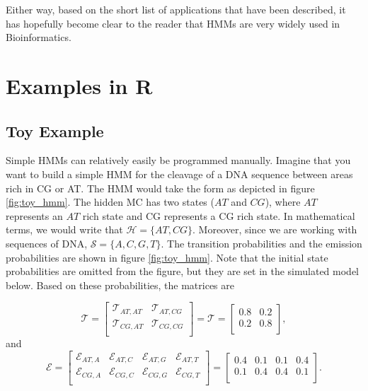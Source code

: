 \documentclass{article}\usepackage[]{graphicx}\usepackage[]{color}
\begin{document}
Either way, based on the short list of applications that have been described, it has hopefully become clear to the reader that HMMs are very widely used in Bioinformatics. 

\section{Examples in R}

\subsection{Toy Example}

Simple HMMs can relatively easily be programmed manually. Imagine that you want to build a simple HMM for the cleavage of a DNA sequence between areas rich in CG or AT. The HMM would take the form as depicted in figure \ref{fig:toy_hmm}. The hidden MC has two states ($AT$ and $CG$), where $AT$ represents an $AT$ rich state and CG represents a CG rich state. In mathematical terms, we would write that $\mathcal{H} = \{AT, CG\}$. Moreover, since we are working with sequences of DNA, $\mathcal{S} = \{A,C,G,T\}$. The transition probabilities and the emission probabilities are shown in figure \ref{fig:toy_hmm}. Note that the initial state probabilities are omitted from the figure, but they are set in the simulated model below. Based on these probabilities, the matrices are

\begin{equation*}
  \mathcal{T} = \begin{bmatrix}
      \mathcal{T}_{AT, AT} & \mathcal{T}_{AT, CG} \\
      \mathcal{T}_{CG, AT} & \mathcal{T}_{CG, CG}  \\
  \end{bmatrix} = \mathcal{T} = \begin{bmatrix}
      0.8 & 0.2 \\
      0.2 & 0.8  \\
  \end{bmatrix},
\end{equation*}
and 
\begin{equation*}
  \mathcal{E} = \begin{bmatrix}
      \mathcal{E}_{AT, A} & \mathcal{E}_{AT, C} & \mathcal{E}_{AT, G} & \mathcal{E}_{AT, T}\\
      \mathcal{E}_{CG, A} & \mathcal{E}_{CG, C} & \mathcal{E}_{CG, G} & \mathcal{E}_{CG, T}\\
  \end{bmatrix} = \begin{bmatrix}
     0.4 & 0.1 & 0.1 & 0.4 \\
      0.1 & 0.4 & 0.4 & 0.1 \\
  \end{bmatrix}.
\end{equation*}
\end{document}
